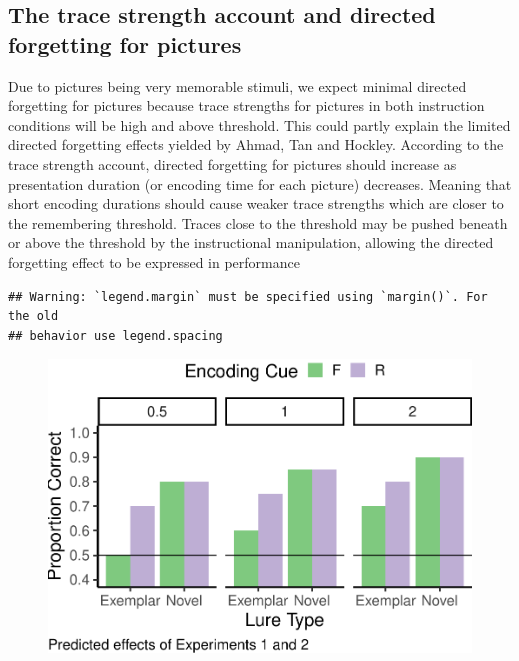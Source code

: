 \documentclass[
  english,
  man,floatsintext]{apa6}
\begin{document}
\hypertarget{the-trace-strength-account-and-directed-forgetting-for-pictures}{%
\subsection{The trace strength account and directed forgetting for pictures}\label{the-trace-strength-account-and-directed-forgetting-for-pictures}}

Due to pictures being very memorable stimuli, we expect minimal directed forgetting for pictures because trace strengths for pictures in both instruction conditions will be high and above threshold. This could partly explain the limited directed forgetting effects yielded by Ahmad, Tan and Hockley. According to the trace strength account, directed forgetting for pictures should increase as presentation duration (or encoding time for each picture) decreases. Meaning that short encoding durations should cause weaker trace strengths which are closer to the remembering threshold. Traces close to the threshold may be pushed beneath or above the threshold by the instructional manipulation, allowing the directed forgetting effect to be expressed in performance

\begin{verbatim}
## Warning: `legend.margin` must be specified using `margin()`. For the old
## behavior use legend.spacing
\end{verbatim}

\begin{figure}
\includegraphics[width=1\linewidth]{honorsThesis_NEW_files/figure-latex/unnamed-chunk-1-1} \caption{ }\label{fig:unnamed-chunk-1}
\end{figure}
\end{document}
